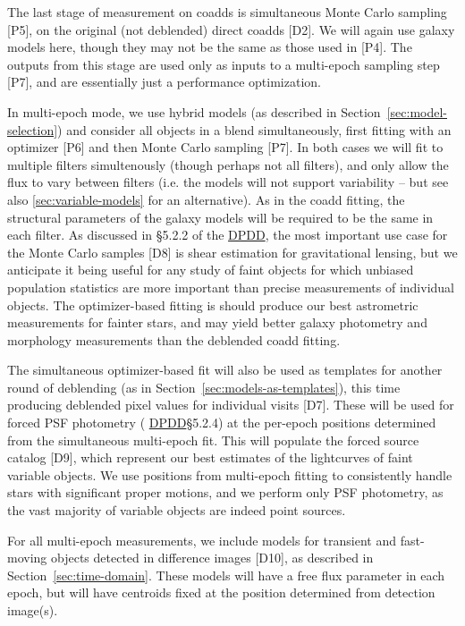 \documentclass[10pt]{article}
\newcommand{\ds}[2]{{\color{blue} \href{https://docushare.lsstcorp.org/docushare/dsweb/Get/#1}{#2}}\xspace}
\newcommand{\DPDD}{\ds{LSE-163}{DPDD}}
\begin{document}
The last stage of measurement on coadds is simultaneous Monte Carlo sampling
[P5], on the original (not deblended) direct coadds [D2].  We will again use
galaxy models here, though they may not be the same as those used in [P4].
The outputs from this stage are used only as inputs to a multi-epoch
sampling step [P7], and are essentially just a performance optimization.

In multi-epoch mode, we use hybrid models (as described in
Section~\ref{sec:model-selection}) and consider all objects in a blend
simultaneously, first fitting with an optimizer [P6] and then Monte Carlo
sampling [P7].  In both cases we will fit to multiple filters simultenously
(though perhaps not all filters), and only allow the flux to vary between
filters (i.e. the models will not support variability -- but see also
\ref{sec:variable-models} for an alternative).  As in the coadd fitting, the
structural parameters of the galaxy models will be required to be the same in
each filter.  As discussed in \S 5.2.2 of the \DPDD, the most important use
case for the Monte Carlo samples [D8] is
shear estimation for gravitational lensing, but we anticipate it being useful
for any study of faint objects for which unbiased population statistics are
more important than precise measurements of individual objects.  The
optimizer-based fitting is should produce our best astrometric measurements
for fainter stars, and may yield better galaxy photometry and morphology
measurements than the deblended coadd fitting.

The simultaneous optimizer-based fit will also be used as templates for
another round of deblending (as in Section~\ref{sec:models-as-templates}),
this time producing deblended pixel values for individual visits [D7].  These
will be used for forced PSF photometry (\DPDD \S 5.2.4) at the per-epoch
positions determined
from the simultaneous multi-epoch fit.  This will populate the forced source
catalog [D9], which represent our best estimates of the lightcurves of
faint variable objects.  We use positions from multi-epoch fitting to
consistently handle stars with significant proper motions, and we perform only
PSF photometry, as the vast majority of variable objects are indeed point
sources.

For all multi-epoch measurements, we include models for transient and fast-
moving objects detected in difference images [D10], as described in
Section~\ref{sec:time-domain}. These models will have a free flux
parameter in each epoch, but will have centroids fixed at the position
determined from detection image(s).
\end{document}
